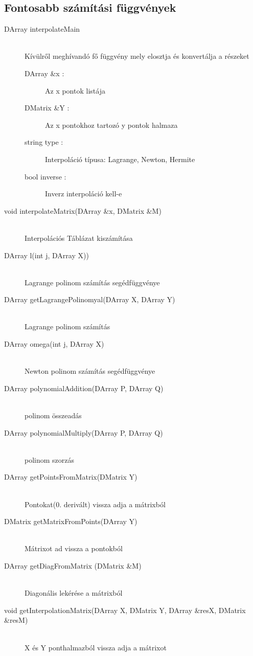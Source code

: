\subsection{Fontosabb számítási függvények}
	\begin{description}
		\item[DArray interpolateMain] 
			\hfill \\ Kívülről meghívandó fő függvény mely elosztja és konvertálja a részeket
			\begin{description}
			  \item[DArray \&x :] Az x pontok listája 
			  \item[DMatrix \&Y :] Az x pontokhoz tartozó y pontok halmaza
			  \item[string type :] 
			  	Interpoláció típusa: Lagrange, Newton, Hermite
			  \item[bool inverse :] Inverz interpoláció kell-e
			\end{description}
		\item[void interpolateMatrix(DArray \&x, 	DMatrix \&M)] \hfill \\ 
			Interpolációs Táblázat kiszámítása
		\item[DArray l(int j, DArray X))] \hfill \\ 
			Lagrange polinom számítás segédfüggvénye
		\item[DArray getLagrangePolinomyal(DArray X, DArray Y)] \hfill \\ 
			Lagrange polinom számítás
		\item[DArray omega(int j, DArray X)] \hfill \\ 
			Newton polinom számítás segédfüggvénye
		\item[DArray polynomialAddition(DArray P, DArray Q)] \hfill \\ 
			polinom összeadás
		\item[DArray polynomialMultiply(DArray P, DArray Q)] \hfill \\ 
			polinom szorzás
		\item[DArray getPointsFromMatrix(DMatrix Y)] \hfill \\ 
			Pontokat(0. derivált) vissza adja a mátrixból
		\item[DMatrix getMatrixFromPoints(DArray Y)] \hfill \\ 
			Mátrixot ad vissza a pontokból
		\item[DArray getDiagFromMatrix (DMatrix \&M)] 
		\hfill \\
			Diagonális lekérése a mátrixból
		\item[void getInterpolationMatrix(DArray X, DMatrix Y, DArray \&resX, DMatrix \&resM)] \hfill \\
			 X és Y ponthalmazból vissza adja a mátrixot 
	\end{description}
